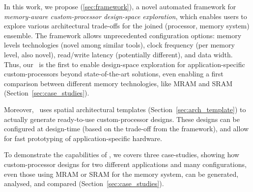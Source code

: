 In this work, we propose \frameworkname (\ref{sec:framework}), a novel automated framework for \textit{memory-aware custom-processor design-space exploration}, which enables users to explore various architectural trade-offs for the joined (processor, memory system) ensemble. The framework allows unprecedented configuration options: memory levels technologies (novel among similar tools), clock frequency (per memory level, also novel), read/write latency (potentially different), and data width. Thus, our \frameworkname~is the first to enable design-space exploration for application-specific custom-processors beyond state-of-the-art solutions, even enabling a first comparison between different memory technologies, like MRAM and SRAM (Section~\ref{sec:case_studies}).

Moreover, \frameworkname~uses spatial architectural templates (Section~\ref{sec:arch_template}) to actually generate ready-to-use custom-processor designs. These designs can be configured at design-time (based on the trade-off from the framework), and allow for fast prototyping of application-specific hardware.  

To demonstrate the capabilities of \frameworkname, we covers three case-studies, showing how custom-processor designs for two different applications and many configurations, even those using MRAM or SRAM for the memory system, can be generated, analysed, and compared (Section~\ref{sec:case_studies}).
 





